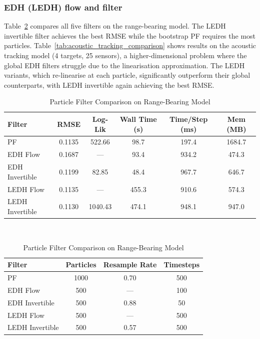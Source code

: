 \documentclass{article}
\begin{document}
\subsubsection{EDH (LEDH) flow and filter}
Table~\ref{tab:range_bearing_comparison} compares all five filters on the range-bearing model. The LEDH invertible filter achieves the best RMSE while the bootstrap PF requires the most particles. Table~\ref{tab:acoustic_tracking_comparison} shows results on the acoustic tracking model (4 targets, 25 sensors), a higher-dimensional problem where the global EDH filters struggle due to the linearisation approximation. The LEDH variants, which re-linearise at each particle, significantly outperform their global counterparts, with LEDH invertible again achieving the best RMSE.






\begin{table}[H]
\centering
\caption{Particle Filter Comparison on Range-Bearing Model}
\begin{tabular}{lccccc}
\toprule
\textbf{Filter} & \textbf{RMSE} & \textbf{Log-Lik} & \textbf{Wall Time (s)} & \textbf{Time/Step (ms)} & \textbf{Mem (MB)} \\
\midrule
PF                & 0.1135 & 522.66  & 98.7   & 197.4   & 1684.7 \\
EDH Flow          & 0.1687 & ---     & 93.4   & 934.2   & 474.3  \\
EDH Invertible    & 0.1199 & 82.85   & 48.4   & 967.7   & 646.7  \\
LEDH Flow         & 0.1135 & ---     & 455.3  & 910.6   & 574.3  \\
LEDH Invertible   & 0.1130 & 1040.43 & 474.1  & 948.1   & 947.0  \\
\bottomrule
\end{tabular}
\\[1em]
\begin{tabular}{lccc}
\toprule
\textbf{Filter} & \textbf{Particles} & \textbf{Resample Rate} & \textbf{Timesteps} \\
\midrule
PF                & 1000 & 0.70 & 500 \\
EDH Flow          & 500  & ---  & 100 \\
EDH Invertible    & 500  & 0.88 & 50  \\
LEDH Flow         & 500  & ---  & 500 \\
LEDH Invertible   & 500  & 0.57 & 500 \\
\bottomrule
\end{tabular}
\label{tab:range_bearing_comparison}
\end{table}
\end{document}
